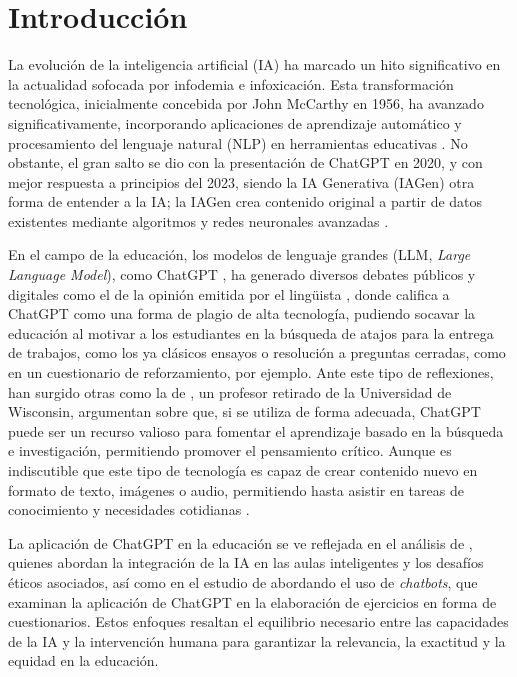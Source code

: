 \section{Introducción}\label{sec-Introducción}

La evolución de la inteligencia artificial (IA) ha marcado un hito
significativo en la actualidad sofocada por infodemia e infoxicación.
Esta transformación tecnológica, inicialmente concebida por John
McCarthy en 1956, ha avanzado significativamente, incorporando
aplicaciones de aprendizaje automático y procesamiento del lenguaje
natural (NLP) en herramientas educativas \cite{Sadiku2021}. No obstante, el gran salto se dio con la presentación de
ChatGPT en 2020, y con mejor respuesta a principios del 2023, siendo la
IA Generativa (IAGen) otra forma de entender a la IA; la IAGen crea
contenido original a partir de datos existentes mediante algoritmos y
redes neuronales avanzadas \cite{Feuerriegel2024}.

En el campo de la educación, los modelos de lenguaje grandes (LLM,
\emph{Large Language Model}), como ChatGPT \cite{OpenAI2023}, ha generado
diversos debates públicos y digitales como el de la opinión emitida por
el lingüista {\textcite{Chomsky2023}}, donde califica a ChatGPT como una forma de plagio de alta
tecnología, pudiendo socavar la educación al motivar a los estudiantes
en la búsqueda de atajos para la entrega de trabajos, como los ya
clásicos ensayos o resolución a preguntas cerradas, como en un
cuestionario de reforzamiento, por ejemplo. Ante este tipo de
reflexiones, han surgido otras como la de \textcite{Yell2023}, un
profesor retirado de la Universidad de Wisconsin, argumentan sobre que,
si se utiliza de forma adecuada, ChatGPT puede ser un recurso valioso
para fomentar el aprendizaje basado en la búsqueda e investigación,
permitiendo promover el pensamiento crítico. Aunque es indiscutible que
este tipo de tecnología es capaz de crear contenido nuevo en formato de
texto, imágenes o audio, permitiendo hasta asistir en tareas de
conocimiento y necesidades cotidianas \cite{Feuerriegel2024}.

La aplicación de ChatGPT en la educación se ve reflejada en el análisis
de \textcite{Dimitriadou2023}, quienes abordan la integración de la
IA en las aulas inteligentes y los desafíos éticos asociados, así como
en el estudio de \textcite{Tlili2023} abordando el uso de
\emph{chatbots}, que examinan la aplicación de ChatGPT en la elaboración
de ejercicios en forma de cuestionarios. Estos enfoques resaltan el
equilibrio necesario entre las capacidades de la IA y la intervención
humana para garantizar la relevancia, la exactitud y la equidad en la
educación.

